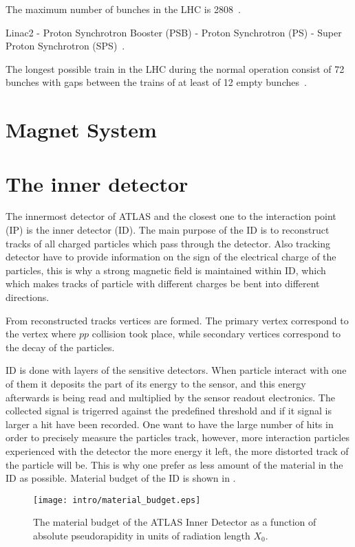 The maximum number of bunches in the LHC is 2808~\cite{lhc_tdr_vol1}.

Linac2 - Proton Synchrotron Booster (PSB) - Proton Synchrotron (PS) - Super Proton Synchrotron (SPS)~\cite{lhc_tdr_vol3}.



The longest possible train in the LHC during the normal operation consist of 72 bunches
with gaps between the trains of at least of 12 empty bunches~\cite{lhc_tdr_vol3}.



\section{Magnet System}
\section{The inner detector}
\label{sec:ID}

The innermost detector of ATLAS and the closest one to the interaction point (IP) is the inner detector (ID).
The main purpose of the ID is to reconstruct tracks of all charged particles which pass through the detector.
Also tracking detector have to provide information on the sign of the electrical charge of the particles, 
this is why a strong magnetic field is maintained within ID, which 
which makes tracks of particle with different charges be bent into different directions.

From reconstructed tracks vertices are formed. The primary vertex correspond to the vertex where $pp$ collision took place, 
while secondary vertices correspond to the decay of the particles.

ID is done with layers of the sensitive detectors. When particle interact with one of them it deposits the part of its energy to the sensor,
and this energy afterwards is being read and multiplied by the sensor readout electronics. The collected signal is trigerred against the predefined threshold and if 
it signal is larger a hit have been recorded.
One want to have the large number of hits in order to precisely measure the particles track, however, more interaction particles experienced with the detector the more
energy it left, the more distorted track of the particle will be. This is why one prefer as less amount of the material in the ID as possible.
Material  budget of the ID is shown in .

\begin{figure}
\centering
\texttt{[image: intro/material\_budget.eps]}
\caption{ 
The material budget of the ATLAS Inner Detector as a function of absolute pseudorapidity in units of radiation length $X_0$.
}
\label{fig:material_budget}
\end{figure}


